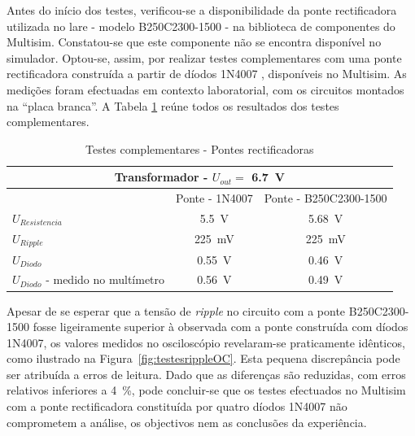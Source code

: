 Antes do início dos testes, verificou-se a disponibilidade da ponte rectificadora utilizada no \acrshort{lare} - modelo B250C2300-1500 - na biblioteca de componentes do Multisim. Constatou-se que este componente não se encontra disponível no simulador. Optou-se, assim, por realizar testes complementares com uma ponte rectificadora construída a partir de díodos 1N4007 \cite{1N400x}, disponíveis no Multisim. As medições foram efectuadas em contexto laboratorial, com os circuitos montados na ``placa branca''. A Tabela \ref{Table:testespontes} reúne todos os resultados dos testes complementares.

\begin{table}[htb]
\centering
\caption{Testes complementares - Pontes rectificadoras} 
\label{Table:testespontes}
\begin{tabular}{lcc}
\toprule
\multicolumn{3}{c}{Transformador - $U_{out} = $ \SI{6,7}{\volt}} \\
\midrule
 & Ponte - 1N4007 & Ponte - B250C2300-1500 \\
\midrule
$U_{Resistencia}$ & \SI{5,5}{\volt} & \SI{5,68}{\volt} \\
\midrule
$U_{Ripple}$ & \SI{225}{\milli\volt} & \SI{225}{\milli\volt} \\
\midrule
$U_{Diodo}$ & \SI{0,55}{\volt} & \SI{0,46}{\volt} \\
\midrule
$U_{Diodo}$ - medido no multímetro & \SI{0,56}{\volt} & \SI{0,49}{\volt} \\
\bottomrule
\end{tabular}
\end{table}

Apesar de se esperar que a tensão de \textit{ripple} no circuito com a ponte B250C2300-1500 fosse ligeiramente superior à observada com a ponte construída com díodos 1N4007, os valores medidos no osciloscópio revelaram-se praticamente idênticos, como ilustrado na Figura~\ref{fig:testesrippleOC}. Esta pequena discrepância pode ser atribuída a erros de leitura. Dado que as diferenças são reduzidas, com erros relativos inferiores a \SI{4}{\percent}, pode concluir-se que os testes efectuados no Multisim com a ponte rectificadora constituída por quatro díodos 1N4007 não comprometem a análise, os objectivos nem as conclusões da experiência.

